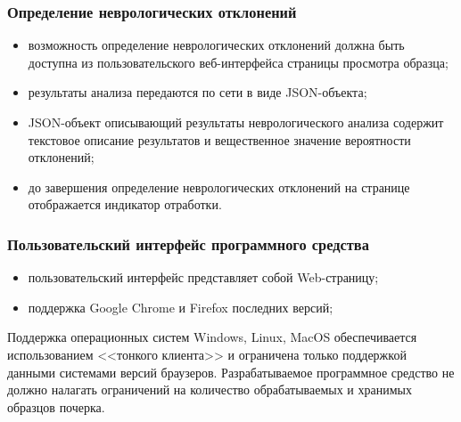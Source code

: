 \subsubsection{Определение неврологических отклонений}
\label{sec:freq:neuro_analysis}
\begin{itemize}
	\item возможность определение неврологических отклонений должна быть доступна из пользовательского веб-интерфейса страницы просмотра образца;
	\item результаты анализа передаются по сети в виде JSON-объекта;
	\item JSON-объект описывающий результаты неврологического анализа содержит текстовое описание результатов и вещественное значение вероятности отклонений;
	\item до завершения определение неврологических отклонений на странице отображается индикатор отработки.
\end{itemize}

\subsubsection{Пользовательский интерфейс программного средства}
\begin{itemize}
	\item пользовательский интерфейс представляет собой Web-страницу;
	\item поддержка Google Chrome и Firefox последних версий;
\end{itemize}

Поддержка операционных систем Windows, Linux, MacOS обеспечивается использованием <<тонкого клиента>> и ограничена только поддержкой данными системами версий браузеров.
Разрабатываемое программное средство не должно налагать ограничений на количество обрабатываемых и хранимых образцов почерка.